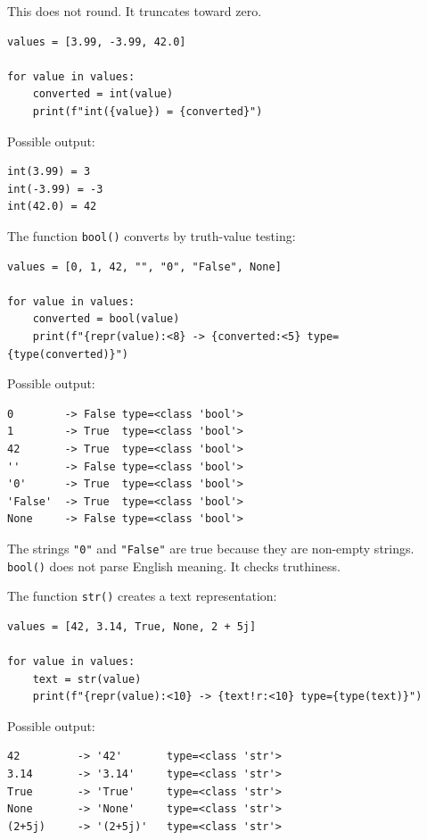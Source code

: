 This does not round. It truncates toward zero.

\begin{verbatim}
values = [3.99, -3.99, 42.0]

for value in values:
    converted = int(value)
    print(f"int({value}) = {converted}")
\end{verbatim}

Possible output:

\begin{verbatim}
int(3.99) = 3
int(-3.99) = -3
int(42.0) = 42
\end{verbatim}

The function \texttt{bool()} converts by truth-value testing:

\begin{verbatim}
values = [0, 1, 42, "", "0", "False", None]

for value in values:
    converted = bool(value)
    print(f"{repr(value):<8} -> {converted:<5} type={type(converted)}")
\end{verbatim}

Possible output:

\begin{verbatim}
0        -> False type=<class 'bool'>
1        -> True  type=<class 'bool'>
42       -> True  type=<class 'bool'>
''       -> False type=<class 'bool'>
'0'      -> True  type=<class 'bool'>
'False'  -> True  type=<class 'bool'>
None     -> False type=<class 'bool'>
\end{verbatim}

The strings \texttt{"0"} and \texttt{"False"} are true because they are non-empty strings. \texttt{bool()} does not parse English meaning. It checks truthiness.

The function \texttt{str()} creates a text representation:

\begin{verbatim}
values = [42, 3.14, True, None, 2 + 5j]

for value in values:
    text = str(value)
    print(f"{repr(value):<10} -> {text!r:<10} type={type(text)}")
\end{verbatim}

Possible output:

\begin{verbatim}
42         -> '42'       type=<class 'str'>
3.14       -> '3.14'     type=<class 'str'>
True       -> 'True'     type=<class 'str'>
None       -> 'None'     type=<class 'str'>
(2+5j)     -> '(2+5j)'   type=<class 'str'>
\end{verbatim}

